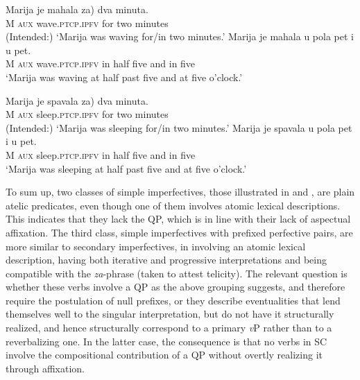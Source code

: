 \documentclass[output=paper]{langscibook}
\begin{document}
\ea\label{ars:ex:test-simple-b}
	\begin{xlist} 
		
	    \ex  \gll Marija je mahala \minsp{(*} za) dva minuta.\\ 
                  M \textsc{aux} wave\textsc{.ptcp.ipfv} {} for two minutes\\ 
            \glt (Intended:) `Marija was waving for\slash in two minutes.' \label{ars:ex:test-simple-ba}
        \ex  \gll Marija je mahala u pola pet i u pet.\\ 
                 M \textsc{aux} wave\textsc{.ptcp.ipfv} in half five and in five\\ 
            \glt `Marija was waving at half past five and at five o'clock.' \label{ars:ex:test-simple-bb}

	\end{xlist}
\ex\label{ars:ex:test-simple-c}
	\begin{xlist} 
		
	    \ex  \gll Marija je spavala \minsp{(*} za) dva minuta.\\ 
                  M \textsc{aux} sleep\textsc{.ptcp.ipfv} {} for two minutes\\ 
            \glt (Intended:) `Marija was sleeping for\slash in two minutes.' \label{ars:ex:test-simple-ca}
        \ex  \gll Marija je spavala u pola pet i u pet.\\ 
                 M \textsc{aux} sleep\textsc{.ptcp.ipfv} in half five and in five\\ 
            \glt `Marija was sleeping at half past five and at five o'clock.' \label{ars:ex:test-simple-cb}

	\end{xlist}
\z

\noindent To sum up, two classes of simple imperfectives, those illustrated in  and , are plain atelic predicates, even though one of them involves atomic lexical descriptions. This indicates that they lack the QP, which is in line with their lack of aspectual affixation. The third class, simple imperfectives with prefixed perfective pairs, are more similar to secondary imperfectives, in involving an atomic lexical description, having both iterative and progressive interpretations and being compatible with the \textit{za}-phrase (taken to attest telicity). The relevant question is whether these verbs involve a QP as the above grouping suggests, and therefore require the postulation of null prefixes, or they describe eventualities that lend themselves well to the singular interpretation, but do not have it structurally realized, and hence structurally correspond to a primary \textit{v}P rather than to a reverbalizing one. In the latter case, the consequence is that no verbs in SC involve the compositional contribution of a QP without overtly realizing it through affixation.
\end{document}
